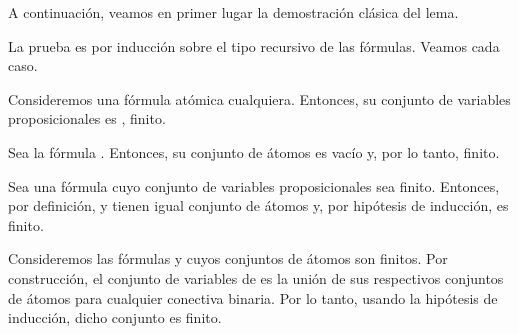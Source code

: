 \begin{isabellebody}
\begin{isamarkuptext}
  A continuación, veamos en primer lugar la demostración clásica del 
  lema. 

  \begin{demostracion}
  La prueba es por inducción sobre el tipo recursivo de las fórmulas. 
  Veamos cada caso.
  
  Consideremos una fórmula atómica  cualquiera. Entonces, 
  su conjunto de variables proposicionales es , finito.

  Sea la fórmula \isa{{\isasymbottom}}. Entonces, su conjunto de átomos es vacío y, por 
  lo tanto, finito.
  
  Sea  una fórmula cuyo conjunto de variables proposicionales sea 
  finito. Entonces, por definición,  y  tienen igual conjunto de
  átomos y, por hipótesis de inducción, es finito.

  Consideremos las fórmulas  y  cuyos conjuntos de átomos son 
  finitos. Por construcción, el conjunto de variables de  es la 
  unión de sus respectivos conjuntos de átomos para cualquier \isa{{\isacharasterisk}} 
  conectiva binaria. Por lo tanto, usando la hipótesis de inducción, 
  dicho conjunto es finito. 
  \end{demostracion} 


\end{isamarkuptext}
\end{isabellebody}
